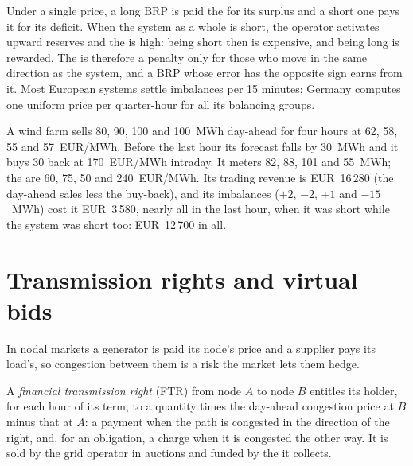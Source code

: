 Under a single price, a long BRP is paid the  for its surplus and a short one
pays it for its deficit. When the system as a whole is short, the operator activates upward
reserves and the  is high: being short then is expensive, and being long is
rewarded. The  is therefore a penalty only for those who move in the same
direction as the system, and a BRP whose error has the opposite sign earns from it. Most
European systems settle imbalances per 15 minutes; Germany computes one uniform price per
quarter-hour for all its balancing groups.

\begin{example}\label{ex:m3:power-markets-trading:wind}
A wind farm sells 80, 90, 100 and 100~MWh day-ahead for four hours at 62, 58, 55 and
\qty{57}{EUR/MWh}. Before the last hour its forecast falls by 30~MWh and it buys 30 back at
\qty{170}{EUR/MWh} intraday. It meters 82, 88, 101 and 55~MWh; the  are 60,
75, 50 and \qty{240}{EUR/MWh}. Its trading revenue is EUR~16\,280 (the day-ahead sales less
the buy-back), and its imbalances ($+2$, $-2$, $+1$ and $-15$~MWh) cost it EUR~3\,580, nearly
all in the last hour, when it was short while the system was short too: EUR~12\,700 in all.
\end{example}

\section{Transmission rights and virtual bids}

In nodal markets a generator is paid its node's price and a supplier pays its load's, so
congestion between them is a risk the market lets them hedge.

\begin{definition}\label{def:m3:power-markets-trading:ftr}
A \emph{financial transmission right} (FTR) from node $A$
to node $B$ entitles its holder, for each hour of its term, to a quantity times the day-ahead
congestion price at $B$ minus that at $A$: a payment when the path is congested in the
direction of the right, and, for an obligation, a charge when it is congested the other way.
It is sold by the grid operator in auctions and funded by the  it collects.
\end{definition}

